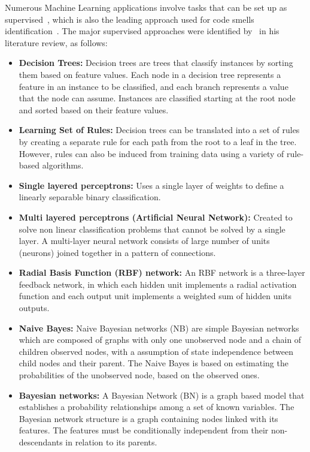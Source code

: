 Numerous Machine Learning applications involve tasks that can be set up as supervised~\citep{kotsiantis2007supervised}, which is also the leading approach used for code smells identification~\citep{fernandes2016review}. The major supervised approaches were identified by~\citet{kotsiantis2007supervised} in his literature review, as follows:
\begin{itemize}
    \item \textbf{Decision Trees:} Decision trees are trees that classify instances by sorting them based on feature values. Each node in a decision tree represents a feature in an instance to be classified, and each branch represents a value that the node can assume. Instances are classified starting at the root node and sorted based on their feature values. 
    \item \textbf{Learning Set of Rules:} Decision trees can be translated into a set of rules by creating a separate rule for each path from the root to a leaf in the tree. However, rules can also be induced from training data using a variety of rule-based algorithms.
    \item \textbf{Single layered perceptrons:} Uses a single layer of weights to define a linearly separable binary classification.
    \item \textbf{Multi layered perceptrons (Artificial Neural Network):} Created to solve non linear classification problems that cannot be solved by a single layer. A multi-layer neural network consists of large number of units (neurons) joined together in a pattern of connections. 
    \item \textbf{Radial Basis Function (RBF) network:} An RBF network is a three-layer feedback network, in which each hidden unit implements a radial activation function and each output unit implements a weighted sum of hidden units outputs.
    \item \textbf{Naive Bayes:} Naive Bayesian networks (NB) are simple Bayesian networks which are composed of graphs with only one unobserved node and a chain of children observed nodes, with a assumption of state independence between child nodes and their parent. The Naive Bayes is based on estimating the probabilities of the unobserved node, based on the observed ones.
    \item \textbf{Bayesian networks:} A Bayesian Network (BN) is a graph based model that establishes a probability relationships among a set of known variables. The Bayesian network structure is a graph containing nodes linked with its features. The features must be conditionally independent from their non-descendants in relation to its parents.

\end{itemize}
